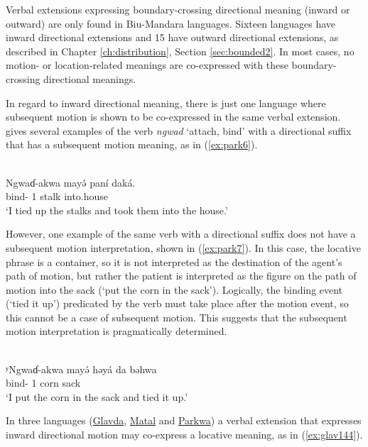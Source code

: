 Verbal extensions expressing boundary-crossing directional meaning (inward or outward) are only found in Biu-Mandara languages. Sixteen languages have inward directional extensions and 15 have outward directional extensions, as described in Chapter \ref{ch:distribution}, Section \ref{sec:bounded2}. In most cases, no motion- or location-related meanings are co-expressed with these boundary-crossing directional meanings. 

In regard to inward directional meaning, there is just one language where subsequent motion is shown to be co-expressed in the same verbal extension. \citet{jarvisPodokoVerbalDirectionals1983} gives several examples of the verb \textit{ngwad} `attach, bind' with a directional suffix that has a subsequent motion meaning, as in (\ref{ex:park6}). 

\ea\label{ex:park6}
 \\
\gll Ngwaɗ-akwa mayə́ paní daká.	\\
bind- 1 stalk into.house	\\
\glt `I tied up the stalks and took them into the house.'
\z

However, one example of the same verb with a directional suffix does not have a subsequent motion interpretation, shown in (\ref{ex:park7}). In this case, the locative phrase is a container, so it is not interpreted as the destination of the agent's path of motion, but rather the patient is interpreted as the figure on the path of motion into the sack (`put the corn in the sack'). Logically, the binding event (`tied it up') predicated by the verb must take place after the motion event, so this cannot be a case of subsequent motion. This suggests that the subsequent motion interpretation is pragmatically determined. 

\ea\label{ex:park7}
 \\
\gll ʸNgwaɗ-akwa mayə́ həyá da bəhwa\\
bind- 1 corn  sack \\
\glt `I put the corn in the sack and tied it up.'
\z

In three languages (\hyperref[glav]{Glavda}, \hyperref[mata]{Matal} and \hyperref[park]{Parkwa}) a verbal extension that expresses inward directional motion may co-express a locative meaning, as in (\ref{ex:glav144}). 


